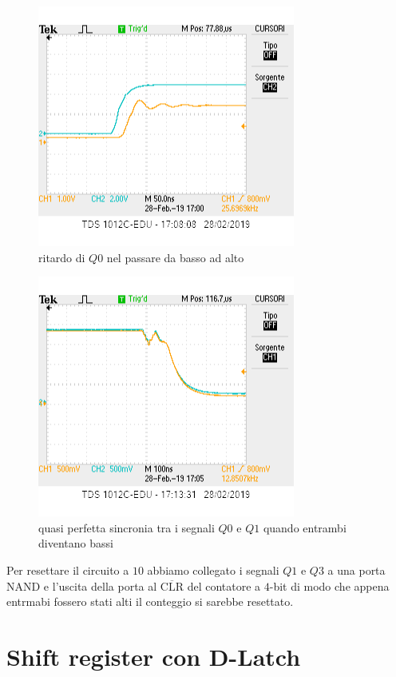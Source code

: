 \documentclass[10pt,a4paper]{article}
\begin{document}
\begin{figure}[h]
			\centering
			\includegraphics[scale=0.85]{tcounter_1}
			\caption{ritardo di $Q0$ nel passare da basso ad alto}
			\label{fig:t2}
\end{figure}

\begin{figure}[h]
			\centering
			\includegraphics[scale=0.85]{Q0Q1sincroni}
			\caption{quasi perfetta sincronia tra i segnali $Q0$ e $Q1$ quando entrambi diventano bassi}
			\label{fig:q0q1}
\end{figure}

Per resettare il circuito a $10$  abbiamo collegato i segnali $Q1$ e $Q3$ a una porta NAND e l'uscita della porta  al $\overline{\mathrm{CLR}}$ del contatore a $4$-bit di modo che appena entrmabi fossero stati alti il conteggio si sarebbe resettato.
\section{ Shift register con D-Latch}
\end{document}
